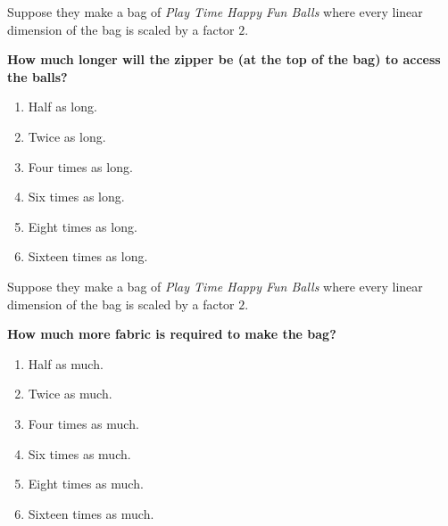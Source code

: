 \documentclass[handout,noauthor,nooutcomes]{ximera}
\begin{document}
\begin{exercise}
 Suppose they make a bag of \textit{Play Time Happy Fun Balls} where
  every linear dimension of the bag is scaled by a factor $2$.

  
  \textbf{How much longer will the zipper be (at the top of the bag)
    to access the balls?}
  \begin{multicols}{2}
  \begin{enumerate}
  \item Half as long.
  \item Twice as long.
  \item Four times as long.
  \item Six times as long.
  \item Eight times as long.
  \item Sixteen times as long.
  \end{enumerate}
  \end{multicols}
\end{exercise}



\begin{exercise}
  Suppose they make a bag of \textit{Play Time Happy Fun Balls} where
  every linear dimension of the bag is scaled by a factor $2$.

  
  \textbf{How much more fabric is required to make the bag?}
  \begin{multicols}{2}
    \begin{enumerate}
    \item Half as much.
    \item Twice as much.
    \item Four times as much.
    \item Six times as much.
    \item Eight times as much.
    \item Sixteen times as much.
    \end{enumerate}
  \end{multicols}
\end{exercise}




\end{document}
